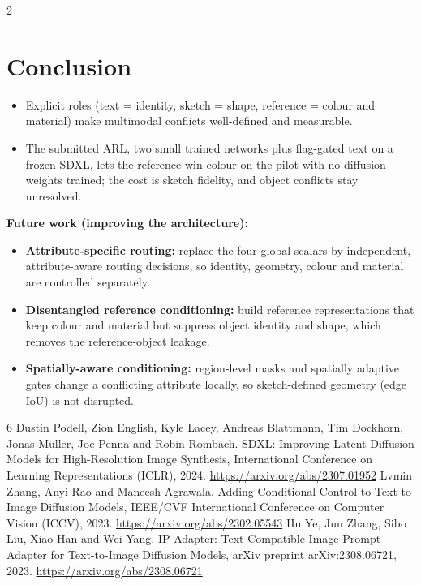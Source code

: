 \documentclass[a1,portrait]{a0poster}
\begin{document}
\begin{minipage}[c]{\linewidth}
\begin{framed}
\begin{multicols}{2}
\section*{Conclusion}
\begin{itemize}
	\item Explicit roles (text = identity, sketch = shape, reference = colour and material) make multimodal conflicts well-defined and measurable.
	\item The submitted ARL, two small trained networks plus flag-gated text on a frozen SDXL, lets the reference win colour on the pilot with no diffusion weights trained; the cost is sketch fidelity, and object conflicts stay unresolved.
\end{itemize}
\textbf{Future work (improving the architecture):}
\begin{itemize}
	\item \textbf{Attribute-specific routing:} replace the four global scalars by independent, attribute-aware routing decisions, so identity, geometry, colour and material are controlled separately.
	\item \textbf{Disentangled reference conditioning:} build reference representations that keep colour and material but suppress object identity and shape, which removes the reference-object leakage.
	\item \textbf{Spatially-aware conditioning:} region-level masks and spatially adaptive gates change a conflicting attribute locally, so sketch-defined geometry (edge IoU) is not disrupted.
\end{itemize}
\begin{thebibliography}{6}
\footnotesize
{} Dustin Podell, Zion English, Kyle Lacey, Andreas Blattmann, Tim Dockhorn, Jonas M\"uller, Joe Penna and Robin Rombach. SDXL: Improving Latent Diffusion Models for High-Resolution Image Synthesis, International Conference on Learning Representations (ICLR), 2024. \url{https://arxiv.org/abs/2307.01952}
 Lvmin Zhang, Anyi Rao and Maneesh Agrawala. Adding Conditional Control to Text-to-Image Diffusion Models, IEEE/CVF International Conference on Computer Vision (ICCV), 2023. \url{https://arxiv.org/abs/2302.05543}
 Hu Ye, Jun Zhang, Sibo Liu, Xiao Han and Wei Yang. IP-Adapter: Text Compatible Image Prompt Adapter for Text-to-Image Diffusion Models, arXiv preprint arXiv:2308.06721, 2023. \url{https://arxiv.org/abs/2308.06721}

\end{thebibliography}
\end{multicols}
\end{framed}
\end{minipage}
\end{document}
